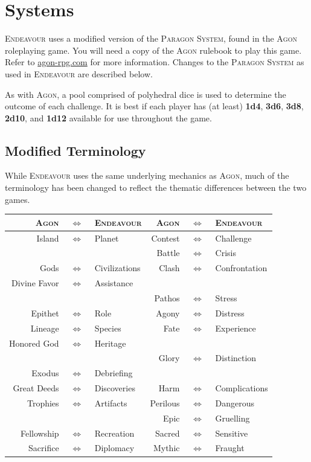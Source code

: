 \documentclass[11pt, a5paper, parskip=half-, DIV=12]{scrartcl}
\newcommand{\tablesep}{\,\,$\Longleftrightarrow$\,\,}
\newcommand{\AGON}{\textsc{Agon}}%
\newcommand{\ENDEAVOUR}{\textsc{Endeavour}}%
\begin{document}
\section*{Systems}
\ENDEAVOUR{} uses a modified version of the \textsc{Paragon System}, found in the \AGON{} roleplaying game. You will need a copy of the \AGON{} rulebook to play this game. Refer to \href{http://www.agon-rpg.com}{agon-rpg.com} for more information. Changes to the \textsc{Paragon System} as used in \ENDEAVOUR{} are described below.

As with \AGON{}, a pool comprised of polyhedral dice is used to determine the outcome of each challenge. It is best if each player has (at least) \textbf{1d4}, \textbf{3d6}, \textbf{3d8}, \textbf{2d10}, and \textbf{1d12} available for use throughout the game.

\subsection*{Modified Terminology}
While \ENDEAVOUR{} uses the same underlying mechanics as \AGON{}, much of the terminology has been changed to reflect the thematic differences between the two games.%
\small
\begin{center}
\begin{tabular}{r@{}c@{}l@{\hskip 4.5ex}r@{}c@{}l} \toprule
\AGON & \tablesep & \ENDEAVOUR & \AGON & \tablesep & \ENDEAVOUR \\ \midrule
Island & \tablesep & Planet & Contest & \tablesep & Challenge \\
& & & Battle & \tablesep & Crisis \\
Gods & \tablesep & Civilizations & Clash & \tablesep & Confrontation \\
Divine Favor & \tablesep & Assistance & & & \\
& & & Pathos & \tablesep & Stress \\
Epithet & \tablesep & Role & Agony & \tablesep & Distress\\
Lineage & \tablesep & Species & Fate & \tablesep & Experience\\ 
Honored God & \tablesep & Heritage & & \\
& & & Glory & \tablesep & Distinction \\
Exodus & \tablesep & Debriefing & & \\
Great Deeds & \tablesep & Discoveries & Harm & \tablesep & Complications \\
Trophies & \tablesep & Artifacts & Perilous & \tablesep & Dangerous \\
& & & Epic & \tablesep & Gruelling \\
Fellowship & \tablesep & Recreation & Sacred & \tablesep & Sensitive\\ 
Sacrifice & \tablesep & Diplomacy & Mythic & \tablesep & Fraught \\ \bottomrule 
\end{tabular}
\end{center}
\normalsize
\end{document}
